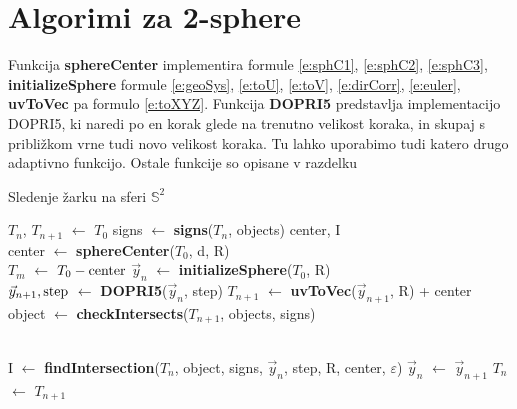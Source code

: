 \documentclass[titlepage]{article}
\begin{document}
\section{Algorimi za 2-sphere}
Funkcija \textbf{sphereCenter} implementira formule \eqref{e:sphC1}, \eqref{e:sphC2}, \eqref{e:sphC3}, \textbf{initializeSphere} formule \eqref{e:geoSys}, \eqref{e:toU}, \eqref{e:toV}, \eqref{e:dirCorr}, \eqref{e:euler}, \textbf{uvToVec} pa formulo \eqref{e:toXYZ}. Funkcija \textbf{DOPRI5} predstavlja implementacijo DOPRI5, ki naredi po en korak glede na trenutno velikost koraka, in skupaj s približkom vrne tudi novo velikost koraka. Tu lahko uporabimo tudi katero drugo adaptivno funkcijo. Ostale funkcije so opisane v
razdelku %
\begin{algorithm}
    \caption{Sledenje žarku na sferi $\mathbb{S}^{2}$}
\begin{algorithmic}

    \State $T_{n}$, $T_{n+1}$ $\gets$ $T_{0}$
    \State signs $\gets$ \textbf{signs}($T_{n}$, objects)
    \State center, I
    \\
    \State {}
      \State center $\gets$ \textbf{sphereCenter}($T_{0}$, d, R)
      \\
      \State $T_{m}$ $\gets$ $T_{0} - \hbox{center}$
      \State $\vec{y}_{n}$ $\gets$ \textbf{initializeSphere}($T_{0}$, R) %
    \EndIf
    \\
    \State $\vec{y}_{n+1}, \hbox{step}$ $\gets$ \textbf{DOPRI5}($\vec{y}_{n}$, step) %
    \State $T_{n+1}$ $\gets$ \textbf{uvToVec}($\vec{y}_{n+1}$, R) + center %
    \\
    \State object $\gets$ \textbf{checkIntersects}($T_{n+1}$, objects, signs)
    \\
    \\

      \State I $\gets$ \textbf{findIntersection}($T_{n}$, object, signs, $\vec{y}_{n}$, step, R, center, $\varepsilon$)
      \State {}
    \Else
      \State $\vec{y}_{n}$ $\gets$ $\vec{y}_{n+1}$
      \State $T_{n}$ $\gets$ $T_{n+1}$
    \EndIf
  \EndWhile
\EndFunction
\end{algorithmic}
\end{algorithm}
\end{document}
